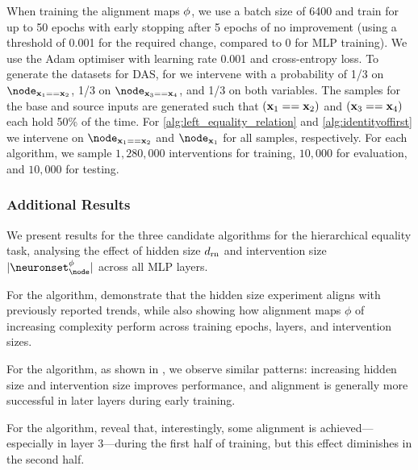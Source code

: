When training the alignment maps $\phi$, we use a batch size of 6400 and train for up to 50 epochs with early stopping after 5 epochs of no improvement (using a threshold of 0.001 for the required change, compared to 0 for MLP training). We use the Adam optimiser with learning rate 0.001 and cross-entropy loss.
To generate the datasets for DAS, for  we intervene with a probability of 1/3 on $\node_{\bx_1==\bx_2}$, 1/3 on $\node_{\bx_3==\bx_4}$, and 1/3 on both variables. The samples for the base and source inputs are generated such that $(\mathbf{x}_1 == \mathbf{x}_2)$ and $(\mathbf{x}_3 == \mathbf{x}_4)$ each hold 50\% of the time. For \cref{alg:left_equality_relation} and \cref{alg:identityoffirst} we intervene on $\node_{\bx_1==\bx_2}$ and $\node_{\bx_1}$ for all samples, respectively. For each algorithm, we sample $1{,}280{,}000$ interventions for training, $10{,}000$ for evaluation, and $10{,}000$ for testing.

\subsubsection{Additional Results}\label{app:heq_additional_results}

We present results for the three candidate algorithms for the hierarchical equality task, analysing the effect of hidden size $d_{\mathrm{rn}}$ and intervention size $\interventionsize$ across all MLP layers.

For the \algbothequality algorithm,  demonstrate that the hidden size experiment aligns with previously reported trends, while also showing how alignment maps $\phi$ of increasing complexity perform across training epochs, layers, and intervention sizes.

For the \algleftequality algorithm, as shown in , we observe similar patterns: increasing hidden size and intervention size improves performance, and alignment is generally more successful in later layers during early training.

For the \algidentityoffirst algorithm,  reveal that, interestingly, some alignment is achieved—especially in layer 3—during the first half of training, but this effect diminishes in the second half.


